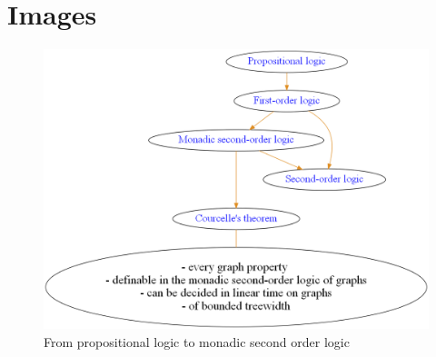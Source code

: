 \documentclass[a4paper, 12pt]{scrartcl}
\begin{document}
\newpage
\appendix
\section{Images}
\begin{figure}[H]
	\centering
	\includegraphics[width=0.8\linewidth]{images/logictheory.png}
	\caption{From propositional logic to monadic second order logic}
	\label{fig:logictheory}
\end{figure}
\end{document}
